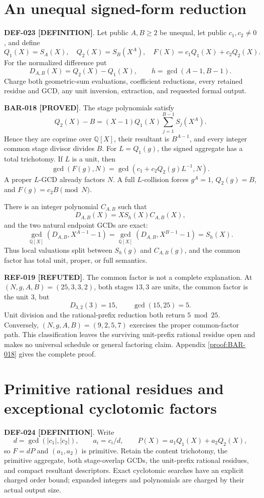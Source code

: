 \documentclass[11pt]{article}
\newcommand{\claimstatus}[2]{\textbf{#1 [#2]}}
\begin{document}
\section{An unequal signed-form reduction}

\claimstatus{DEF-023}{DEFINITION}. Let public \(A,B\ge2\) be unequal, let
public \(c_1,c_2\ne0\), and define
\[
Q_1(X)=S_A(X),\quad Q_2(X)=S_B(X^A),\quad
F(X)=c_1Q_1(X)+c_2Q_2(X).
\]
For the normalized difference put
\[
D_{A,B}(X)=Q_2(X)-Q_1(X),\qquad h=\gcd(A-1,B-1).
\]
Charge both geometric-sum evaluations, coefficient reductions, every
retained residue and GCD, any unit inversion, extraction, and requested
formal output.

\claimstatus{BAR-018}{PROVED}. The stage polynomials satisfy
\[
Q_2(X)-B=(X-1)Q_1(X)\sum_{j=1}^{B-1}S_j(X^A).
\]
Hence they are coprime over \(\mathbb Q[X]\), their resultant is
\(B^{A-1}\), and every integer common stage divisor divides \(B\).
For \(L=Q_1(g)\), the signed aggregate has a total trichotomy. If \(L\) is a
unit, then
\[
\gcd(F(g),N)
=\gcd\!\left(c_1+c_2Q_2(g)L^{-1},N\right).
\]
A proper \(L\)-GCD already factors \(N\). A full \(L\)-collision forces
\(g^A=1\), \(Q_2(g)=B\), and \(F(g)=c_2B\pmod N\).

There is an integer polynomial \(C_{A,B}\) such that
\[
D_{A,B}(X)=XS_h(X)C_{A,B}(X),
\]
and the two natural endpoint GCDs are exact:
\[
\gcd_{\mathbb Q[X]}(D_{A,B},X^{A-1}-1)
=\gcd_{\mathbb Q[X]}(D_{A,B},X^{B-1}-1)=S_h(X).
\]
Thus local valuations split between \(S_h(g)\) and \(C_{A,B}(g)\), and the
common factor has total unit, proper, or full semantics.

\claimstatus{REF-019}{REFUTED}. The common factor is not a complete
explanation. At \((N,g,A,B)=(25,3,3,2)\), both stages \(13,3\) are units,
the common factor is the unit \(3\), but
\[
D_{3,2}(3)=15,\qquad \gcd(15,25)=5.
\]
Unit division and the rational-prefix reduction both return \(5\bmod25\).
Conversely, \((N,g,A,B)=(9,2,5,7)\) exercises the proper common-factor
path. This classification leaves the surviving unit-prefix rational
residue open and makes no universal schedule or general factoring claim.
Appendix \ref{proof:BAR-018} gives the complete proof.

\section{Primitive rational residues and exceptional cyclotomic factors}

\claimstatus{DEF-024}{DEFINITION}. Write
\[
d=\gcd(|c_1|,|c_2|),\qquad a_i=c_i/d,\qquad
P(X)=a_1Q_1(X)+a_2Q_2(X),
\]
so \(F=dP\) and \((a_1,a_2)\) is primitive. Retain the content trichotomy,
the primitive aggregate, both stage-overlap GCDs, the unit-prefix rational
residues, and compact resultant descriptors. Exact cyclotomic searches have
an explicit charged order bound; expanded integers and polynomials are
charged by their actual output size.
\end{document}
